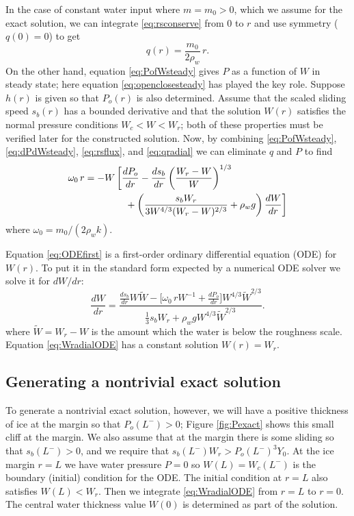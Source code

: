 \documentclass[gmd]{copernicus}   %
\begin{document}
In the case of constant water input where $m = m_0 > 0$, which we assume for the exact solution, we can integrate \eqref{eq:rsconserve} from $0$ to $r$ and use symmetry ($q(0)=0$) to get
\begin{equation}
q(r) = \frac{m_0}{2\rho_w} \, r. \label{eq:qradial}
\end{equation}
On the other hand, equation \eqref{eq:PofWsteady} gives $P$ as a function of $W$ in steady state; here equation \eqref{eq:openclosesteady} has played the key role.  Suppose $h(r)$ is given so that $P_o(r)$ is also determined.  Assume that the scaled sliding speed $s_b(r)$ has a bounded derivative and that the solution $W(r)$ satisfies the normal pressure conditions $W_c < W < W_r$; both of these properties must be verified later for the constructed solution.  Now, by combining \eqref{eq:PofWsteady}, \eqref{eq:dPdWsteady}, \eqref{eq:rsflux}, and \eqref{eq:qradial} we can eliminate $q$ and $P$ to find
\begin{align}
&\omega_0\, r = - W\, \bigg[\frac{dP_o}{dr} - \frac{ds_b}{dr} \left(\frac{W_r - W}{W}\right)^{1/3}  \label{eq:ODEfirst} \\
&\qquad \qquad \qquad + \left(\frac{s_b W_r}{3 W^{4/3} (W_r - W)^{2/3}} + \rho_w g\right) \frac{dW}{dr}\bigg] \notag
\end{align}
where $\omega_0 = m_0 / (2 \rho_w k)$.

Equation \eqref{eq:ODEfirst} is a first-order ordinary differential equation (ODE) for $W(r)$.  To put it in the standard form expected by a numerical ODE solver we solve it for $dW/dr$:
\begin{equation}
\frac{dW}{dr} = \frac{\frac{ds_b}{dr} W \tilde W - \Big[\omega_0\, r W^{-1} + \frac{dP_o}{dr}\Big] W^{4/3} \tilde W^{2/3}}{\frac{1}{3} s_b W_r + \rho_w g W^{4/3} \tilde W^{2/3}}.
\label{eq:WradialODE}
\end{equation}
where $\tilde W = W_r - W$ is the amount which the water is below the roughness scale.  Equation \eqref{eq:WradialODE} has a constant solution $W(r)=W_r$.

\subsection{Generating a nontrivial exact solution}  To generate a nontrivial exact solution, however, we will have a positive thickness of ice at the margin so that $P_o(L^-)>0$; Figure \ref{fig:Pexact} shows this small cliff at the margin.  We also assume that at the margin there is some sliding so that $s_b(L^-)>0$, and we require that $s_b(L^-) W_r > P_o(L^-)^3 Y_0$.  At the ice margin $r=L$ we have water pressure $P=0$ so $W(L)=W_c(L^-)$ is the boundary (initial) condition for the ODE.  The initial condition at $r=L$ also satisfies $W(L) < W_r$.  Then we integrate \eqref{eq:WradialODE} from $r=L$ to $r=0$.  The central water thickness value $W(0)$ is determined as part of the solution.
\end{document}
